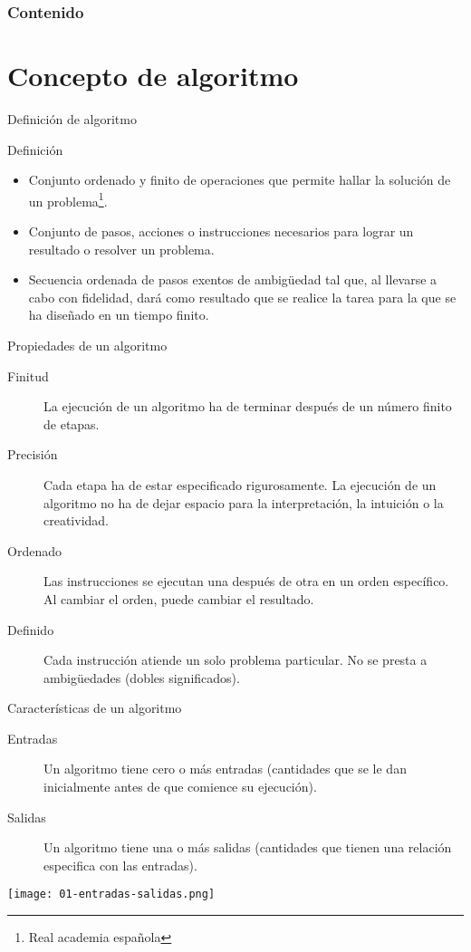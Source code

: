 \begin{frame}
    \frametitle{Contenido}
    \tableofcontents
\end{frame}

\section{Concepto de algoritmo}

\begin{frame}[c]{Definición de algoritmo}
  \begin{block}{Definición}
    \begin{itemize}
      \item Conjunto ordenado y finito de operaciones que permite hallar
            la solución de un problema\footnote{Real academia española}.
      \item Conjunto de pasos, acciones o instrucciones necesarios para
            lograr un resultado o resolver un problema.
      \item Secuencia ordenada de pasos exentos de ambigüedad tal que, al
            llevarse a cabo con fidelidad, dará como resultado que se realice
            la tarea para la que se ha diseñado en un tiempo finito.
    \end{itemize}
  \end{block}
\end{frame}

\begin{frame}[c]{Propiedades de un algoritmo}
  \begin{description}
    \item[Finitud] La ejecución de un algoritmo ha de terminar después de un
      número finito de etapas.
    \item[Precisión] Cada etapa ha de estar especificado rigurosamente. La
      ejecución de un algoritmo no ha de dejar espacio para la interpretación,
      la intuición o la creatividad.
    \item[Ordenado] Las instrucciones se ejecutan una después de otra en un
      orden específico. Al cambiar el orden, puede cambiar el resultado.
    \item[Definido] Cada instrucción atiende un solo problema particular.
      No se presta a ambigüedades (dobles significados).
  \end{description}
\end{frame}

\begin{frame}[c]{Características de un algoritmo}
  \begin{description}
    \item[Entradas] Un algoritmo tiene cero o más entradas (cantidades que se
      le dan inicialmente antes de que comience su ejecución).
    \item[Salidas] Un algoritmo tiene una o más salidas (cantidades que tienen
      una relación especifica con las entradas).
  \end{description}
  \begin{center}
    \texttt{[image: 01-entradas-salidas.png]}
  \end{center}
\end{frame}

